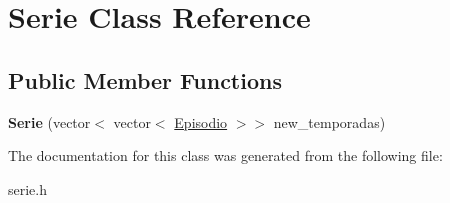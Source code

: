 \hypertarget{classSerie}{}\section{Serie Class Reference}
\label{classSerie}
\subsection*{Public Member Functions}
\begin{DoxyCompactItemize}
\item 
{\bfseries Serie} (vector$<$ vector$<$ \hyperlink{classEpisodio}{Episodio} $>$$>$ new\+\_\+temporadas)\hypertarget{classSerie_a3e28a1bf8b840031d93ca36905923574}{}\label{classSerie_a3e28a1bf8b840031d93ca36905923574}

\end{DoxyCompactItemize}


The documentation for this class was generated from the following file\+:\begin{DoxyCompactItemize}
\item 
serie.\+h\end{DoxyCompactItemize}
